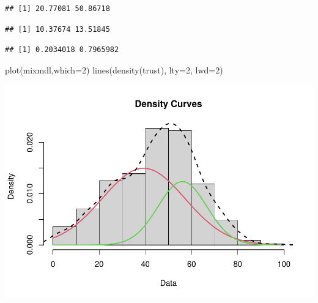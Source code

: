 \documentclass[
]{book}
\newenvironment{Shaded}{\begin{snugshade}}{\end{snugshade}}
\newcommand{\AttributeTok}[1]{\textcolor[rgb]{0.77,0.63,0.00}{#1}}
\newcommand{\DecValTok}[1]{\textcolor[rgb]{0.00,0.00,0.81}{#1}}
\newcommand{\FunctionTok}[1]{\textcolor[rgb]{0.00,0.00,0.00}{#1}}
\newcommand{\NormalTok}[1]{#1}
\newcommand{\SpecialCharTok}[1]{\textcolor[rgb]{0.00,0.00,0.00}{#1}}
\begin{document}
\begin{Shaded}
\end{Shaded}

\begin{verbatim}
## [1] 20.77081 50.86718
\end{verbatim}

\begin{Shaded}
\end{Shaded}

\begin{verbatim}
## [1] 10.37674 13.51845
\end{verbatim}

\begin{Shaded}
\end{Shaded}

\begin{verbatim}
## [1] 0.2034018 0.7965982
\end{verbatim}

\begin{Shaded}
\begin{Highlighting}[]
\FunctionTok{plot}\NormalTok{(mixmdl,}\AttributeTok{which=}\DecValTok{2}\NormalTok{)}
\FunctionTok{lines}\NormalTok{(}\FunctionTok{density}\NormalTok{(trust), }\AttributeTok{lty=}\DecValTok{2}\NormalTok{, }\AttributeTok{lwd=}\DecValTok{2}\NormalTok{)}
\end{Highlighting}
\end{Shaded}

\includegraphics{bookdown-demo_files/figure-latex/307-2.pdf}
\end{document}
